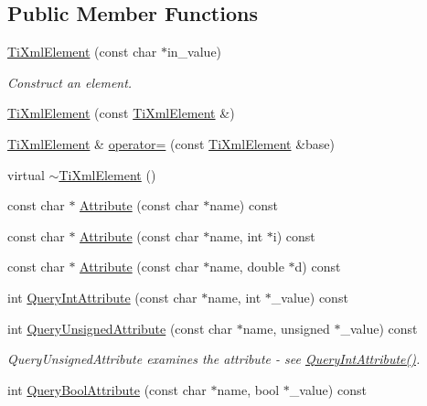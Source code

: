 \subsection*{Public Member Functions}
\begin{DoxyCompactItemize}
\item 
\hyperlink{class_ti_xml_element_a01bc3ab372d35da08efcbbe65ad90c60}{Ti\+Xml\+Element} (const char $\ast$in\+\_\+value)
\begin{DoxyCompactList}\small\item\em Construct an element. \end{DoxyCompactList}\item 
\hyperlink{class_ti_xml_element_a1ca4465f3c2eac6a60e641cd7f1d9f7e}{Ti\+Xml\+Element} (const \hyperlink{class_ti_xml_element}{Ti\+Xml\+Element} \&)
\item 
\hyperlink{class_ti_xml_element}{Ti\+Xml\+Element} \& \hyperlink{class_ti_xml_element_ad58d300f4cfc0016ffa6861ebb718a0b}{operator=} (const \hyperlink{class_ti_xml_element}{Ti\+Xml\+Element} \&base)
\item 
virtual \hyperlink{class_ti_xml_element_aa049a47c5081c0d021968666360da261}{$\sim$\+Ti\+Xml\+Element} ()
\item 
const char $\ast$ \hyperlink{class_ti_xml_element_a6042f518748f475a7ac4b4e0b509eb05}{Attribute} (const char $\ast$name) const
\item 
const char $\ast$ \hyperlink{class_ti_xml_element_a8005d0b808fd02bd1246710cdf95e5f6}{Attribute} (const char $\ast$name, int $\ast$i) const
\item 
const char $\ast$ \hyperlink{class_ti_xml_element_a09df893402d0ab1402c8725e6d30ec04}{Attribute} (const char $\ast$name, double $\ast$d) const
\item 
int \hyperlink{class_ti_xml_element_a5c0f739e0f6f5905a201364532e54a60}{Query\+Int\+Attribute} (const char $\ast$name, int $\ast$\+\_\+value) const
\item 
int \hyperlink{class_ti_xml_element_ab75c83543d4ace62f4c40d7e8e392fc3}{Query\+Unsigned\+Attribute} (const char $\ast$name, unsigned $\ast$\+\_\+value) const
\begin{DoxyCompactList}\small\item\em Query\+Unsigned\+Attribute examines the attribute -\/ see \hyperlink{class_ti_xml_element_a5c0f739e0f6f5905a201364532e54a60}{Query\+Int\+Attribute()}. \end{DoxyCompactList}\item 
int \hyperlink{class_ti_xml_element_a5789b1488af75b6ae37a749700495ceb}{Query\+Bool\+Attribute} (const char $\ast$name, bool $\ast$\+\_\+value) const

\end{DoxyCompactItemize}

